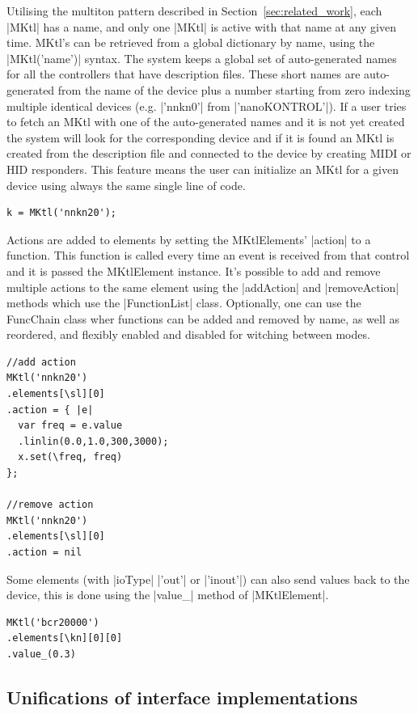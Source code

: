 \documentclass{article}
\begin{document}
Utilising the multiton pattern described in Section~\ref{sec:related_work}, each |MKtl| has a name, and only one |MKtl| is active with that name at any given time. 
MKtl's can be retrieved from a global dictionary by name, using the |MKtl('name')| syntax. 
The system keeps a global set of auto-generated names for all the controllers that have description files. These short names are auto-generated from the name of the device plus a number starting from zero indexing multiple identical devices (e.g. |'nnkn0'| from |'nanoKONTROL'|). If a user tries to fetch an MKtl with one of the auto-generated names and it is not yet created the system will look for the corresponding device and if it is found an MKtl is created from the description file and connected to the device by creating MIDI or HID responders. This feature means the user can initialize an MKtl for a given device using always the same single line of code.

\begin{Verbatim}
k = MKtl('nnkn20');
\end{Verbatim}

Actions are added to elements by setting the MKtlElements' |action| to a function. This function is called every time an event is received from that control and it is passed the MKtlElement instance. It's possible to add and remove multiple actions to the same element using the |addAction| and |removeAction| methods which use the |FunctionList| class. Optionally, one can use the FuncChain class wher functions can be added and removed by name, as well as reordered, and flexibly enabled and disabled for witching between modes. 

\begin{Verbatim}
//add action
MKtl('nnkn20')
.elements[\sl][0]
.action = { |e|
  var freq = e.value
  .linlin(0.0,1.0,300,3000);
  x.set(\freq, freq)
};

//remove action
MKtl('nnkn20')
.elements[\sl][0]
.action = nil
\end{Verbatim}

Some elements (with |ioType| |'out'| or |'inout'|) can also send values back to the device, this is done using the |value_| method of |MKtlElement|.

\begin{Verbatim}	
MKtl('bcr20000')
.elements[\kn][0][0]
.value_(0.3)
\end{Verbatim}

\subsection{Unifications of interface implementations}
\label{sub:unifications_of_interface_implementations}
\end{document}
